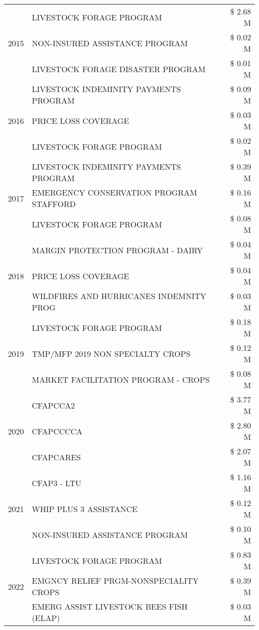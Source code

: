 \begin{tabular}{llr}
\cline{1-3}
\multirow[t]{3}{*}{2015} & LIVESTOCK FORAGE PROGRAM & \$ 2.68 M \\
 & NON-INSURED ASSISTANCE PROGRAM & \$ 0.02 M \\
 & LIVESTOCK FORAGE DISASTER PROGRAM & \$ 0.01 M \\
\cline{1-3}
\multirow[t]{3}{*}{2016} & LIVESTOCK INDEMINITY PAYMENTS PROGRAM & \$ 0.09 M \\
 & PRICE LOSS COVERAGE & \$ 0.03 M \\
 & LIVESTOCK FORAGE PROGRAM & \$ 0.02 M \\
\cline{1-3}
\multirow[t]{3}{*}{2017} & LIVESTOCK INDEMINITY PAYMENTS PROGRAM & \$ 0.39 M \\
 & EMERGENCY CONSERVATION PROGRAM STAFFORD & \$ 0.16 M \\
 & LIVESTOCK FORAGE PROGRAM & \$ 0.08 M \\
\cline{1-3}
\multirow[t]{3}{*}{2018} & MARGIN PROTECTION PROGRAM - DAIRY & \$ 0.04 M \\
 & PRICE LOSS COVERAGE & \$ 0.04 M \\
 & WILDFIRES AND HURRICANES INDEMNITY PROG & \$ 0.03 M \\
\cline{1-3}
\multirow[t]{3}{*}{2019} & LIVESTOCK FORAGE PROGRAM & \$ 0.18 M \\
 & TMP/MFP 2019 NON SPECIALTY CROPS & \$ 0.12 M \\
 & MARKET FACILITATION PROGRAM - CROPS & \$ 0.08 M \\
\cline{1-3}
\multirow[t]{3}{*}{2020} & CFAPCCA2 & \$ 3.77 M \\
 & CFAPCCCCA & \$ 2.80 M \\
 & CFAPCARES & \$ 2.07 M \\
\cline{1-3}
\multirow[t]{3}{*}{2021} & CFAP3 - LTU & \$ 1.16 M \\
 & WHIP PLUS 3 ASSISTANCE & \$ 0.12 M \\
 & NON-INSURED ASSISTANCE PROGRAM & \$ 0.10 M \\
\cline{1-3}
\multirow[t]{3}{*}{2022} & LIVESTOCK FORAGE PROGRAM & \$ 0.83 M \\
 & EMGNCY RELIEF PRGM-NONSPECIALITY CROPS & \$ 0.39 M \\
 & EMERG ASSIST LIVESTOCK BEES FISH (ELAP) & \$ 0.03 M \\
\cline{1-3}
\bottomrule
\end{tabular}
